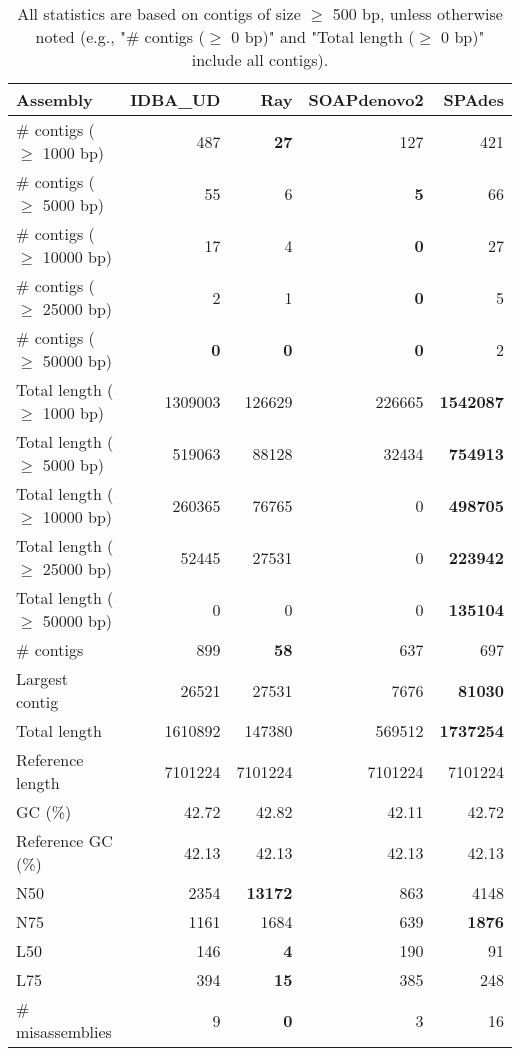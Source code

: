 \documentclass[12pt,a4paper]{article}
\begin{document}
\begin{table}[ht]
\begin{center}
\caption{All statistics are based on contigs of size $\geq$ 500 bp, unless otherwise noted (e.g., "\# contigs ($\geq$ 0 bp)" and "Total length ($\geq$ 0 bp)" include all contigs).}
\begin{tabular}{|l*{4}{|r}|}
\hline
Assembly & IDBA\_UD & Ray & SOAPdenovo2 & SPAdes \\ \hline
\# contigs ($\geq$ 1000 bp) & 487 & {\bf 27} & 127 & 421 \\ \hline
\# contigs ($\geq$ 5000 bp) & 55 & 6 & {\bf 5} & 66 \\ \hline
\# contigs ($\geq$ 10000 bp) & 17 & 4 & {\bf 0} & 27 \\ \hline
\# contigs ($\geq$ 25000 bp) & 2 & 1 & {\bf 0} & 5 \\ \hline
\# contigs ($\geq$ 50000 bp) & {\bf 0} & {\bf 0} & {\bf 0} & 2 \\ \hline
Total length ($\geq$ 1000 bp) & 1309003 & 126629 & 226665 & {\bf 1542087} \\ \hline
Total length ($\geq$ 5000 bp) & 519063 & 88128 & 32434 & {\bf 754913} \\ \hline
Total length ($\geq$ 10000 bp) & 260365 & 76765 & 0 & {\bf 498705} \\ \hline
Total length ($\geq$ 25000 bp) & 52445 & 27531 & 0 & {\bf 223942} \\ \hline
Total length ($\geq$ 50000 bp) & 0 & 0 & 0 & {\bf 135104} \\ \hline
\# contigs & 899 & {\bf 58} & 637 & 697 \\ \hline
Largest contig & 26521 & 27531 & 7676 & {\bf 81030} \\ \hline
Total length & 1610892 & 147380 & 569512 & {\bf 1737254} \\ \hline
Reference length & 7101224 & 7101224 & 7101224 & 7101224 \\ \hline
GC (\%) & 42.72 & 42.82 & 42.11 & 42.72 \\ \hline
Reference GC (\%) & 42.13 & 42.13 & 42.13 & 42.13 \\ \hline
N50 & 2354 & {\bf 13172} & 863 & 4148 \\ \hline
N75 & 1161 & 1684 & 639 & {\bf 1876} \\ \hline
L50 & 146 & {\bf 4} & 190 & 91 \\ \hline
L75 & 394 & {\bf 15} & 385 & 248 \\ \hline
\# misassemblies & 9 & {\bf 0} & 3 & 16 \\ \hline

\end{tabular}
\end{center}
\end{table}
\end{document}
